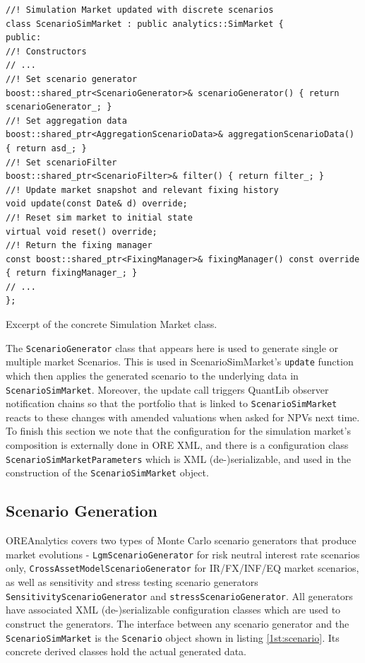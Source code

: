 \documentclass[12pt, a4paper]{article}
\begin{document}
\begin{listing}[H]
\begin{verbatim}
//! Simulation Market updated with discrete scenarios
class ScenarioSimMarket : public analytics::SimMarket {
public:
//! Constructors
// ...
//! Set scenario generator
boost::shared_ptr<ScenarioGenerator>& scenarioGenerator() { return scenarioGenerator_; }
//! Set aggregation data
boost::shared_ptr<AggregationScenarioData>& aggregationScenarioData() { return asd_; }
//! Set scenarioFilter
boost::shared_ptr<ScenarioFilter>& filter() { return filter_; }
//! Update market snapshot and relevant fixing history
void update(const Date& d) override;
//! Reset sim market to initial state
virtual void reset() override;
//! Return the fixing manager
const boost::shared_ptr<FixingManager>& fixingManager() const override { return fixingManager_; }
// ...
};
\end{verbatim}
\caption{Excerpt of the concrete Simulation Market class.}
\label{1st:scenariosimmarket}
\end{listing}

The {\tt ScenarioGenerator} class that appears here is used to generate single or multiple market Scenarios. This is used in ScenarioSimMarket's {\tt update} function which then
applies the generated scenario to the underlying data in {\tt ScenarioSimMarket}. Moreover, the update call triggers QuantLib observer notification chains so that the portfolio that is linked to {\tt ScenarioSimMarket} reacts to these changes with amended
valuations when asked for NPVs next time. To finish this section we note that the configuration for the simulation market's composition is externally done in ORE XML, and there is a configuration class {\tt ScenarioSimMarketParameters} which is XML (de-)serializable, and used in the construction of the {\tt ScenarioSimMarket} object.

\subsection{Scenario Generation}
OREAnalytics covers two types of Monte Carlo scenario generators that produce market evolutions - {\tt LgmScenarioGenerator} for risk neutral interest rate scenarios only,
{\tt CrossAssetModelScenarioGenerator} for IR/FX/INF/EQ market scenarios, as well as sensitivity and stress testing scenario generators {\tt SensitivityScenarioGenerator} and {\tt stressScenarioGenerator}. 
All generators have associated XML (de-)serializable configuration classes which are used to construct the generators. 
The interface between any scenario generator and the {\tt ScenarioSimMarket} is the {\tt Scenario} object shown in listing \ref{1st:scenario}. Its concrete derived classes hold the actual generated data.
\end{document}
